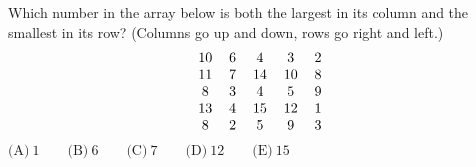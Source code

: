

Which number in the array below is both the largest in its column and the smallest in its row? (Columns go up and down, rows go right and left.) \[\begin{tabular}[t]{ccccc} 10 & 6 & 4 & 3 & 2 \\ 11 & 7 & 14 & 10 & 8 \\ 8 & 3 & 4 & 5 & 9 \\ 13 & 4 & 15 & 12 & 1 \\ 8 & 2 & 5 & 9 & 3 \end{tabular}\]
$\text{(A)}\ 1 \qquad \text{(B)}\ 6 \qquad \text{(C)}\ 7 \qquad \text{(D)}\ 12 \qquad \text{(E)}\ 15$
